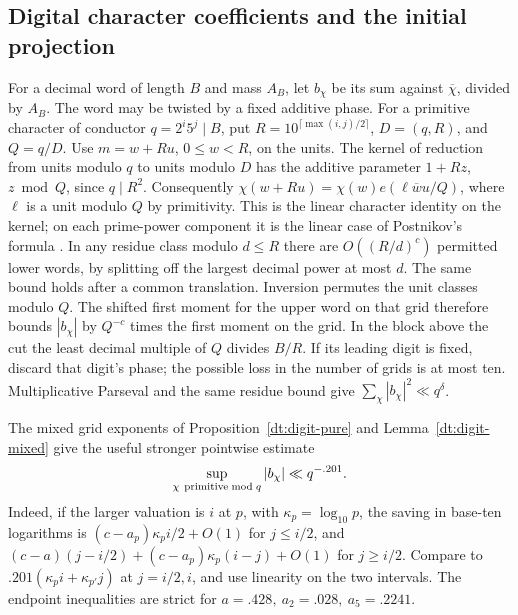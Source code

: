 \documentclass[11pt,a4paper]{article}
\theoremstyle{paperplain}
\numberwithin{equation}{section}
\begin{document}
\subsection{Digital character coefficients and the initial projection}

For a decimal word of length \(B\) and mass \(A_B\), let \(b_\chi\)
be its sum against \(\overline\chi\), divided by \(A_B\). The word
may be twisted by a fixed additive phase. For a primitive character of
conductor \(q=2^i5^j\mid B\), put
\(R=10^{\lceil\max(i,j)/2\rceil}\), \(D=(q,R)\), and \(Q=q/D\).
Use \(m=w+Ru\), \(0\le w<R\), on the units. The kernel of reduction
from units modulo \(q\) to units modulo \(D\) has the additive
parameter \(1+Rz\), \(z\bmod Q\), since \(q\mid R^2\). Consequently
\(\chi(w+Ru)=\chi(w)e(\ell \overline w u/Q)\), where \(\ell\) is a
unit modulo \(Q\) by primitivity. This is the linear character identity on the kernel; on each prime-power component it is the linear case of Postnikov's formula \cite{Postnikov}. In any residue class modulo
\(d\le R\) there are \(O((R/d)^c)\) permitted lower words, by
splitting off the largest decimal power at most \(d\). The same
bound holds after a common translation. Inversion permutes the
unit classes modulo \(Q\). The shifted first moment for the
upper word on that grid therefore bounds \(|b_\chi|\) by \(Q^{-c}\)
times the first moment on the grid. In the block above the cut the
least decimal multiple of \(Q\) divides \(B/R\). If its leading digit
is fixed, discard that digit's phase; the possible loss in the number
of grids is at most ten. Multiplicative Parseval and the same residue
bound give \(\sum_\chi |b_\chi|^2\ll q^\delta\).

The mixed grid exponents of Proposition~\ref{dt:digit-pure} and
Lemma~\ref{dt:digit-mixed} give the useful stronger pointwise estimate
\begin{equation}\label{dt:analytic-linear}
 \sup_{\chi\ {\rm primitive}\bmod q}|b_\chi|\ll q^{-.201}.
\end{equation}
Indeed, if the larger valuation is \(i\) at \(p\), with
\(\kappa_p=\log_{10}p\), the saving in base-ten logarithms is
\((c-a_p)\kappa_p i/2+O(1)\) for \(j\le i/2\), and
\((c-a)(j-i/2)+(c-a_p)\kappa_p(i-j)+O(1)\) for \(j\ge i/2\).
Compare to \(.201(\kappa_p i+\kappa_{p'}j)\) at \(j=i/2,i\), and
use linearity on the two intervals. The endpoint inequalities are
strict for \(a=.428,\ a_2=.028,\ a_5=.2241\).
\end{document}
